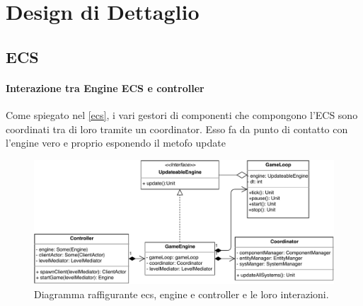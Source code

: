 \chapter{Design di Dettaglio}
\section{ECS}
 \subsubsection{Interazione tra Engine ECS e controller}
 Come spiegato nel \ref{ecs}, i vari gestori di componenti che compongono l'ECS sono coordinati tra di loro tramite un coordinator. Esso fa da punto di contatto con l'engine vero e proprio esponendo il metofo update
 \begin{figure}[H]
	\centering
	\includegraphics[width=\columnwidth]{drawio/ECS-engine-controller/ecs-engine-controller.pdf}
	\caption{Diagramma raffigurante ecs, engine e controller e le loro interazioni.}
	\label{fig:ecsenginecontroller}
\end{figure}
